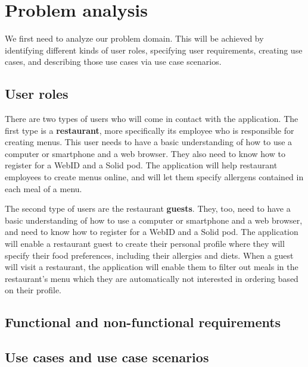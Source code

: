 \chapter{Problem analysis}
We first need to analyze our problem domain.
This will be achieved by identifying different kinds of user roles, specifying user requirements, creating use cases, and describing those use cases via use case scenarios.

\section{User roles}
There are two types of users who will come in contact with the application.
The first type is a \textbf{restaurant}, more specifically its employee who is responsible for creating menus.
This user needs to have a basic understanding of how to use a computer or smartphone and a web browser.
They also need to know how to register for a WebID and a Solid pod.
The application will help restaurant employees to create menus online, and will let them specify allergens contained in each meal of a menu.

The second type of users are the restaurant \textbf{guests}.
They, too, need to have a basic understanding of how to use a computer or smartphone and a web browser, and need to know how to register for a WebID and a Solid pod.
The application will enable a restaurant guest to create their personal profile where they will specify their food preferences, including their allergies and diets.
When a guest will visit a restaurant, the application will enable them to filter out meals in the restaurant's menu which they are automatically not interested in ordering based on their profile.

\section{Functional and non-functional requirements}

\section{Use cases and use case scenarios}